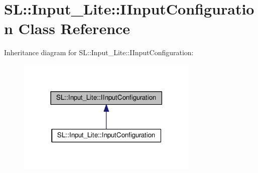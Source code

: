 \hypertarget{class_s_l_1_1_input___lite_1_1_i_input_configuration}{}\section{SL\+:\+:Input\+\_\+\+Lite\+:\+:I\+Input\+Configuration Class Reference}
\label{class_s_l_1_1_input___lite_1_1_i_input_configuration}


Inheritance diagram for SL\+:\+:Input\+\_\+\+Lite\+:\+:I\+Input\+Configuration\+:\nopagebreak
\begin{figure}[H]
\begin{center}
\leavevmode
\includegraphics[width=246pt]{class_s_l_1_1_input___lite_1_1_i_input_configuration__inherit__graph}
\end{center}
\end{figure}
